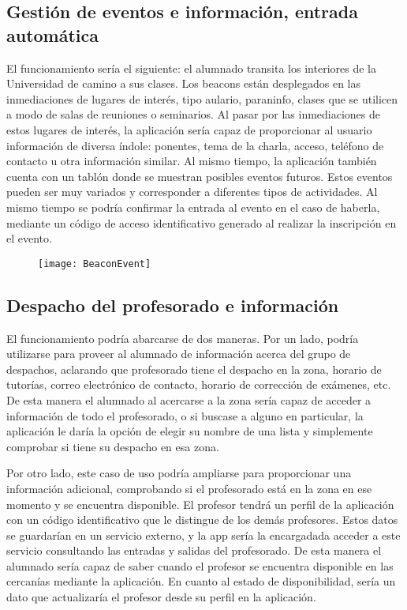 \subsection{Gestión de eventos e información, entrada automática}

El funcionamiento sería el siguiente: el alumnado transita los interiores de la Universidad de camino a sus clases. Los beacons están desplegados en las inmediaciones de lugares de interés, tipo aulario, paraninfo, clases que se utilicen a modo de salas de reuniones o seminarios. Al pasar por las inmediaciones de estos lugares de interés, la aplicación sería capaz de proporcionar al usuario información de diversa índole: ponentes, tema de la charla, acceso, teléfono de contacto u otra información similar.  Al mismo tiempo, la aplicación también cuenta con un tablón donde se muestran posibles eventos futuros. Estos eventos pueden ser muy variados y corresponder a diferentes tipos de actividades. Al mismo tiempo se podría confirmar la entrada al evento en el caso de haberla, mediante un código de acceso identificativo generado al realizar la inscripción en el evento.

\begin{figure}[H]
	\centering
	\texttt{[image: BeaconEvent]}
	\label{fig:eventBeacon}
\end{figure}

\subsection{Despacho del profesorado e información}

El funcionamiento podría abarcarse de dos maneras. Por un lado, podría utilizarse para proveer al alumnado de información acerca del grupo de despachos, aclarando que profesorado tiene el despacho en la zona, horario de tutorías, correo electrónico de contacto, horario de corrección de exámenes, etc. De esta manera el alumnado al acercarse a la zona sería capaz de acceder a información de todo el profesorado, o si buscase a alguno en particular, la aplicación le daría la opción de elegir su nombre de una lista y simplemente comprobar si tiene su despacho en esa zona. 

Por otro lado, este caso de uso podría ampliarse para proporcionar una información adicional, comprobando si el profesorado está en la zona en ese momento y se encuentra disponible. El profesor tendrá un perfil de la aplicación con un código identificativo que le distingue de los demás profesores. Estos datos se guardarían en un servicio externo, y la app sería la encargadada acceder a este servicio consultando las entradas y salidas del profesorado. De esta manera el alumnado sería capaz de saber cuando el profesor se encuentra disponible en las cercanías mediante la aplicación. En cuanto al estado de disponibilidad, sería un dato que actualizaría el profesor desde su perfil en la aplicación. 

